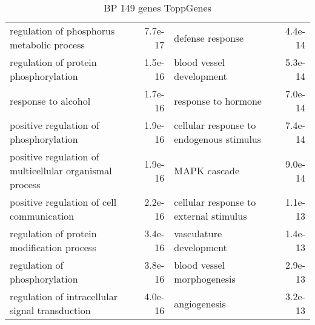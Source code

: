 \documentclass[fleqn,10pt]{SelfArx} %
\begin{document}
\begin{table}[ht]
\begin{tabularx}{\textwidth}{lRlR}
		regulation of phosphorus metabolic process & 7.7e-17 & defense response & 4.4e-14 \\ 
		regulation of protein phosphorylation & 1.5e-16 & blood vessel development & 5.3e-14 \\ 
		response to alcohol & 1.7e-16 & response to hormone & 7.0e-14 \\ 
		positive regulation of phosphorylation & 1.9e-16 & cellular response to endogenous stimulus & 7.4e-14 \\ 
		positive regulation of multicellular organismal process & 1.9e-16 & MAPK cascade & 9.0e-14 \\ 
		positive regulation of cell communication & 2.2e-16 & cellular response to external stimulus & 1.1e-13 \\ 
		regulation of protein modification process & 3.4e-16 & vasculature development & 1.4e-13 \\ 
		regulation of phosphorylation & 3.8e-16 & blood vessel morphogenesis & 2.9e-13 \\ 
		regulation of intracellular signal transduction & 4.0e-16 & angiogenesis & 3.2e-13 \\
	\end{tabularx}
	\smallskip
	\caption{BP 149 genes ToppGenes}
	\label{tab:bp149}
\end{table}
\end{document}
